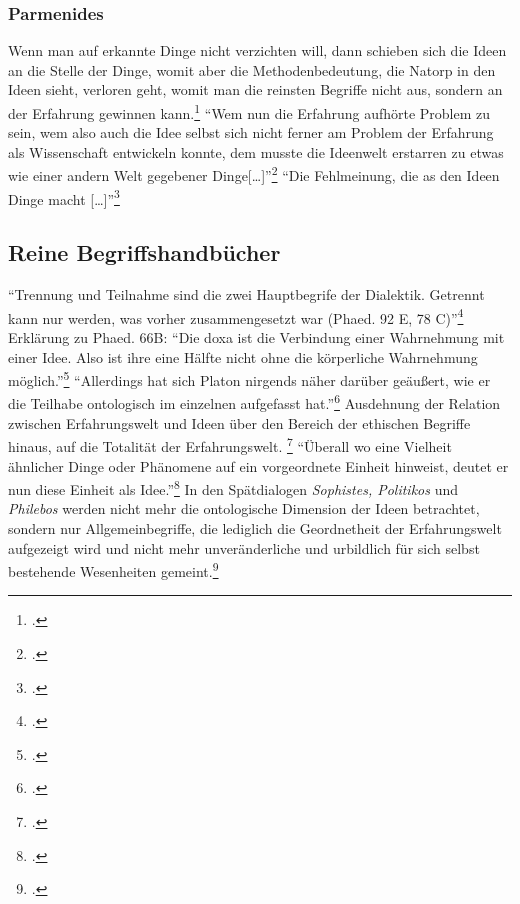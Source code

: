 \documentclass[12pt]{article}
\begin{document}
\subsubsection*{Parmenides}
Wenn man auf erkannte Dinge nicht verzichten will, dann schieben sich die Ideen an die Stelle der Dinge, womit aber die Methodenbedeutung, die Natorp in den Ideen sieht, verloren geht, womit man die reinsten Begriffe nicht aus, sondern an der Erfahrung gewinnen kann.\footcite[vgl.][S. 222f.]{NatorpIdeenlehre} \enquote{Wem nun die Erfahrung aufhörte Problem zu sein, wem also auch die Idee selbst sich nicht ferner am Problem der Erfahrung als Wissenschaft entwickeln konnte, dem musste die Ideenwelt erstarren zu etwas wie einer andern Welt gegebener Dinge[\dots]}\footcite[vgl.][S. 223]{NatorpIdeenlehre}
\enquote{Die Fehlmeinung, die as den Ideen Dinge macht [\dots]}\footcite[][S. 225]{NatorpIdeenlehre}
\subsection*{Reine Begriffshandbücher}
\enquote{Trennung und Teilnahme sind die zwei Hauptbegrife der Dialektik. Getrennt kann nur werden, was vorher zusammengesetzt war (Phaed. 92 E, 78 C)}\footcite[][S. 349]{Perls}
Erklärung zu Phaed. 66B: \enquote{Die doxa ist die Verbindung einer Wahrnehmung mit einer Idee. Also ist ihre eine Hälfte nicht ohne die körperliche Wahrnehmung möglich.}\footcite[][S. 350]{Perls}
\enquote{Allerdings hat sich Platon nirgends näher darüber geäußert, wie er die Teilhabe ontologisch im einzelnen aufgefasst hat.}\footcite[][S. 172]{Gigon75}
Ausdehnung der Relation zwischen Erfahrungswelt und Ideen über den Bereich der ethischen Begriffe hinaus, auf die Totalität der Erfahrungswelt. \footcite[vgl.][S. 172]{Gigon75} \enquote{Überall wo eine Vielheit ähnlicher Dinge oder Phänomene auf ein vorgeordnete Einheit hinweist, deutet er nun diese Einheit als Idee.}\footcite[][S. 172]{Gigon75}
In den Spätdialogen \emph{Sophistes, Politikos} und \emph{Philebos} werden nicht mehr die ontologische Dimension der Ideen betrachtet, sondern nur Allgemeinbegriffe, die lediglich die Geordnetheit der Erfahrungswelt aufgezeigt wird und nicht mehr unveränderliche und urbildlich für sich selbst bestehende Wesenheiten gemeint.\footcite[vgl.][S. 174]{Gigon75}
\end{document}

